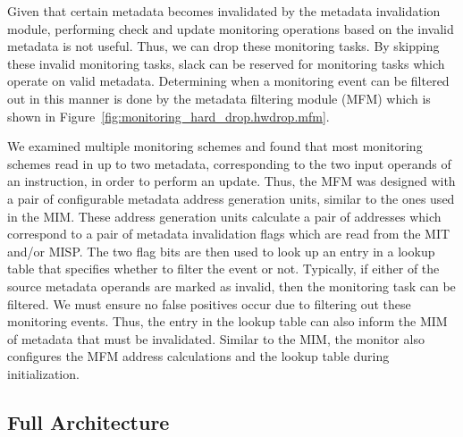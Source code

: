 Given that certain metadata becomes invalidated by the metadata invalidation
module, performing check and update monitoring operations based on the invalid
metadata is not useful. Thus, we can drop these monitoring tasks. By skipping
these invalid monitoring tasks, slack can be reserved for monitoring tasks
which operate on valid metadata. Determining when a monitoring event can be
filtered out in this manner is done by the metadata filtering module (MFM)
which is shown in Figure~\ref{fig:monitoring_hard_drop.hwdrop.mfm}.

We examined multiple monitoring schemes and found that most monitoring schemes
read in up to two metadata, corresponding to the two input operands of an
instruction, in order to perform an update.  Thus, the MFM was designed with a
pair of configurable metadata address generation units, similar to the ones
used in the MIM. These address generation units calculate a pair of addresses
which correspond to a pair of metadata invalidation flags which are read from
the MIT and/or MISP. The two flag bits are then used to look up an entry in a
lookup table that specifies whether to filter the event or not. Typically, if
either of the source metadata operands are marked as invalid, then the
monitoring task can be filtered. We must ensure no false positives occur due
to filtering out these monitoring events. Thus, the entry in the lookup table
can also inform the MIM of metadata that must be invalidated.  Similar to the
MIM, the monitor also configures the MFM address calculations and the lookup
table during initialization.

\subsection{Full Architecture}
\label{sec:monitoring_hard_drop.hwdrop.full_arch}


